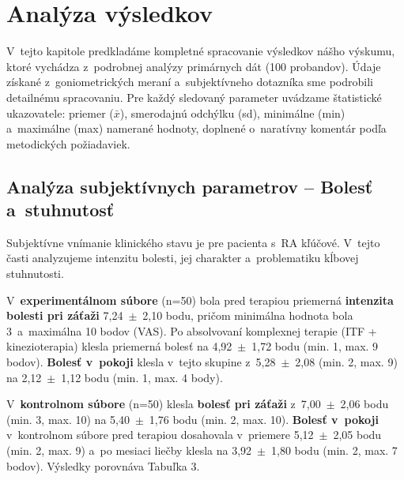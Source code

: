 \section{Analýza výsledkov}

V~tejto kapitole predkladáme kompletné spracovanie výsledkov nášho výskumu, ktoré vychádza z~podrobnej analýzy primárnych dát (100 probandov). Údaje získané z~goniometrických meraní a~subjektívneho dotazníka sme podrobili detailnému spracovaniu. Pre každý sledovaný parameter uvádzame štatistické ukazovatele: priemer ($\bar{x}$), smerodajnú odchýlku (sd), minimálne (min) a~maximálne (max) namerané hodnoty, doplnené o~naratívny komentár podľa metodických požiadaviek.

\subsection{Analýza subjektívnych parametrov – Bolesť a~stuhnutosť}

Subjektívne vnímanie klinického stavu je pre pacienta s~RA kľúčové. V~tejto časti analyzujeme intenzitu bolesti, jej charakter a~problematiku kĺbovej stuhnutosti.

V~\textbf{experimentálnom súbore} (n=50) bola pred terapiou priemerná \textbf{intenzita bolesti pri záťaži} 7,24~$\pm$~2,10 bodu, pričom minimálna hodnota bola 3~a~maximálna 10 bodov (VAS). Po absolvovaní komplexnej terapie (ITF + kinezioterapia) klesla priemerná bolesť na 4,92~$\pm$~1,72 bodu (min. 1, max. 9 bodov). \textbf{Bolesť v~pokoji} klesla v~tejto skupine z~5,28~$\pm$~2,08 (min. 2, max. 9) na 2,12~$\pm$~1,12 bodu (min. 1, max. 4 body).

V~\textbf{kontrolnom súbore} (n=50) klesla \textbf{bolesť pri záťaži} z~7,00~$\pm$~2,06 bodu (min. 3, max. 10) na 5,40~$\pm$~1,76 bodu (min. 2, max. 10). \textbf{Bolesť v~pokoji} v~kontrolnom súbore pred terapiou dosahovala v~priemere 5,12~$\pm$~2,05 bodu (min. 2, max. 9) a~po mesiaci liečby klesla na 3,92~$\pm$~1,80 bodu (min. 2, max. 7 bodov). Výsledky porovnáva Tabuľka 3.

